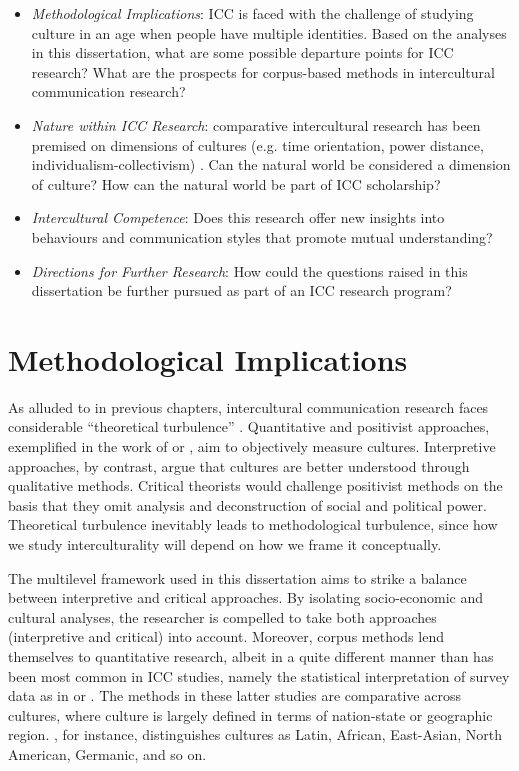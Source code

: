 \begin{itemize}

    \item \textit{Methodological Implications}: ICC is faced with the challenge of studying culture in an age when people have multiple identities. Based on the analyses in this dissertation, what are some possible departure points for ICC research? What are the prospects for corpus-based methods in intercultural communication research?

    \item \textit{Nature within ICC Research}: comparative intercultural research has been premised on dimensions of cultures (e.g. time orientation, power distance, individualism-collectivism) \citep{Hofstede2010a, House2004}. Can the natural world be considered a dimension of culture? How can the natural world be part of ICC scholarship?
    
    \item \textit{Intercultural Competence}: Does this research offer new insights into behaviours and communication styles that promote mutual understanding? 

    \item \textit{Directions for Further Research}: How could the questions raised in this dissertation be further pursued as part of an ICC research program? 
    
\end{itemize}

\section{Methodological Implications}

As alluded to in previous chapters, intercultural communication research faces considerable ``theoretical turbulence'' \citep{Poutiainen2014}. Quantitative and positivist approaches, exemplified in the work of \cite{Hofstede2010a} or \cite{House2004}, aim to objectively measure cultures. Interpretive approaches, by contrast, argue that cultures are better understood through qualitative methods. Critical theorists would challenge positivist methods on the basis that they omit analysis and deconstruction of social and political power. Theoretical turbulence inevitably leads to methodological turbulence, since how we study interculturality will depend on how we frame it conceptually.  

The multilevel framework used in this dissertation aims to strike a balance between interpretive and critical approaches. By isolating socio-economic and cultural analyses, the researcher is compelled to take both approaches (interpretive and critical) into account. Moreover, corpus methods lend themselves to quantitative research, albeit in a quite different manner than has been most common in ICC studies, namely the statistical interpretation of survey data as in \cite{Hofstede2010a} or \cite{House2004}. The methods in these latter studies are comparative across cultures, where culture is largely defined in terms of nation-state or geographic region. \cite{Hofstede2010a}, for instance, distinguishes cultures as Latin, African, East-Asian, North American, Germanic, and so on. 

